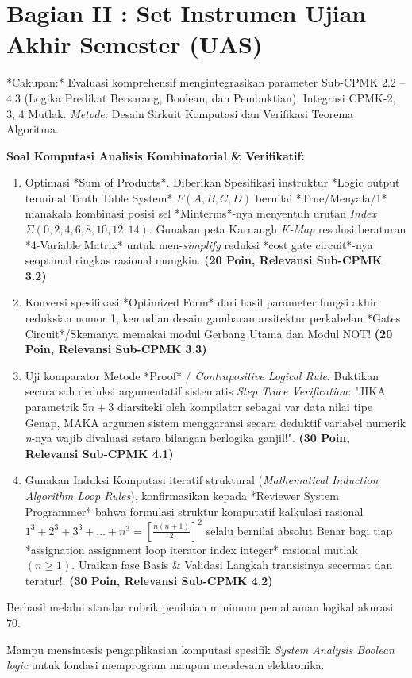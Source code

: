 \documentclass[../main.tex]{subfiles}
\begin{document}
\section{Bagian II : Set Instrumen Ujian Akhir Semester (UAS)}
*Cakupan:* Evaluasi komprehensif mengintegrasikan parameter Sub-CPMK 2.2 -- 4.3 (Logika Predikat Bersarang, Boolean, dan Pembuktian). Integrasi CPMK-2, 3, 4 Mutlak.
\textit{Metode:} Desain Sirkuit Komputasi dan Verifikasi Teorema Algoritma.

\textbf{Soal Komputasi Analisis Kombinatorial \& Verifikatif:}
\begin{enumerate}
    \item Optimasi *Sum of Products*. Diberikan Spesifikasi instruktur *Logic output terminal Truth Table System* $F(A,B,C,D)$ bernilai *True/Menyala/1* manakala kombinasi posisi sel *Minterms*-nya menyentuh urutan \textit{Index} $\Sigma (0, 2, 4, 6, 8, 10, 12, 14)$.
    Gunakan peta Karnaugh \textit{K-Map} resolusi beraturan *4-Variable Matrix* untuk men-\textit{simplify} reduksi *cost gate circuit*-nya seoptimal ringkas rasional mungkin. \textbf{(20 Poin, Relevansi Sub-CPMK 3.2)}
    \item Konversi spesifikasi *Optimized Form* dari hasil parameter fungsi akhir reduksian nomor 1, kemudian desain gambaran arsitektur perkabelan *Gates Circuit*/Skemanya memakai modul Gerbang Utama dan Modul NOT!  \textbf{(20 Poin, Relevansi Sub-CPMK 3.3)}
    \item Uji komparator Metode *Proof* / \textit{Contrapositive Logical Rule}. Buktikan secara sah deduksi argumentatif sistematis \textit{Step Trace Verification}: "JIKA parametrik $5n + 3$ diarsiteki oleh kompilator sebagai var data nilai tipe Genap, MAKA argumen sistem menggaransi secara deduktif variabel numerik \textit{n}-nya wajib divaluasi setara bilangan berlogika ganjil!". \textbf{(30 Poin, Relevansi Sub-CPMK 4.1)}
    \item Gunakan Induksi Komputasi iteratif struktural (\textit{Mathematical Induction Algorithm Loop Rules}), konfirmasikan kepada *Reviewer System Programmer* bahwa formulasi struktur komputatif kalkulasi rasional $1^3 + 2^3 + 3^3 + \dots + n^3 = \left[\frac{n(n+1)}{2}\right]^2$ selalu bernilai absolut Benar bagi tiap *assignation assignment loop iterator index integer* rasional mutlak $(n \geq 1)$. Uraikan fase Basis \& Validasi Langkah transisinya secermat dan teratur!. \textbf{(30 Poin, Relevansi Sub-CPMK 4.2)}
\end{enumerate}

\begin{checklist}
  \item Berhasil melalui standar rubrik penilaian minimum pemahaman logikal akurasi $70$.
  \item Mampu mensintesis pengaplikasian komputasi spesifik \textit{System Analysis Boolean logic} untuk fondasi memprogram maupun mendesain elektronika.
\end{checklist}
\end{document}
